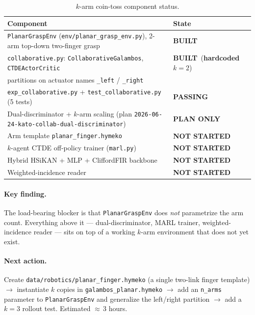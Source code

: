 \documentclass[11pt]{article}
\newcommand{\built}{\textcolor{green!55!black}{\textbf{BUILT}}}
\newcommand{\planonly}{\textcolor{orange!80!black}{\textbf{PLAN ONLY}}}
\newcommand{\notstarted}{\textcolor{red!75!black}{\textbf{NOT STARTED}}}
\newcommand{\passing}{\textcolor{green!55!black}{\textbf{PASSING}}}
\begin{document}
\begin{table}[h]
\centering
\begin{tabular}{@{}ll@{}}
\toprule
\textbf{Component} & \textbf{State} \\
\midrule
\texttt{PlanarGraspEnv} (\texttt{env/planar\_grasp\_env.py}), 2-arm top-down two-finger grasp & \built \\
\texttt{collaborative.py}: \texttt{CollaborativeGalambos}, \texttt{CTDEActorCritic} & \built\ (\textbf{hardcoded $k=2$}) \\
\quad partitions on actuator names \texttt{\_left} / \texttt{\_right} & \\
\texttt{exp\_collaborative.py} + \texttt{test\_collaborative.py} (5 tests) & \passing \\
Dual-discriminator + $k$-arm scaling (plan \texttt{2026-06-24-kato-collab-dual-discriminator}) & \planonly \\
Arm template \texttt{planar\_finger.hymeko} & \notstarted \\
$k$-agent CTDE off-policy trainer (\texttt{marl.py}) & \notstarted \\
Hybrid HSiKAN + MLP + CliffordFIR backbone & \notstarted \\
Weighted-incidence reader & \notstarted \\
\bottomrule
\end{tabular}
\caption{$k$-arm coin-toss component status.}
\end{table}

\paragraph{Key finding.} The load-bearing blocker is that \texttt{PlanarGraspEnv}
does \emph{not} parametrize the arm count. Everything above it ---
dual-discriminator, MARL trainer, weighted-incidence reader --- sits on top of a
working $k$-arm environment that does not yet exist.

\paragraph{Next action.} Create
\texttt{data/robotics/planar\_finger.hymeko} (a single two-link finger template)
$\rightarrow$ instantiate $k$ copies in \texttt{galambos\_planar.hymeko}
$\rightarrow$ add an \texttt{n\_arms} parameter to \texttt{PlanarGraspEnv} and
generalize the left/right partition $\rightarrow$ add a $k=3$ rollout test.
Estimated $\approx$\,3 hours.

\end{document}
